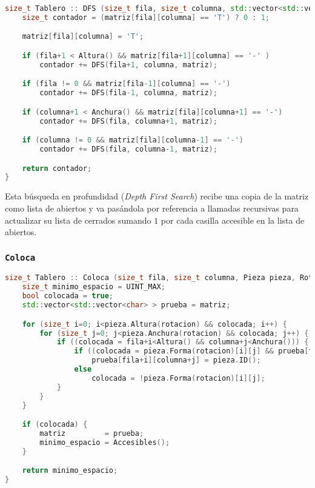 \begin{lstlisting}[language=C++]
size_t Tablero :: DFS (size_t fila, size_t columna, std::vector<std::vector<char> > & matriz) const {
	size_t contador = (matriz[fila][columna] == 'T') ? 0 : 1;

	matriz[fila][columna] = 'T';

	if (fila+1 < Altura() && matriz[fila+1][columna] == '-' )
		contador += DFS(fila+1, columna, matriz);

	if (fila != 0 && matriz[fila-1][columna] == '-')
		contador += DFS(fila-1, columna, matriz);

	if (columna+1 < Anchura() && matriz[fila][columna+1] == '-')
		contador += DFS(fila, columna+1, matriz);

	if (columna != 0 && matriz[fila][columna-1] == '-')
		contador += DFS(fila, columna-1, matriz);

	return contador;
}
\end{lstlisting}

Esta búsqueda en profundidad (\textit{Depth First Search}) recibe una copia de la matriz como lista de abiertos y va pasándola por referencia a llamadas recursivas para actualizar su lista de cerrados sumando $1$ por cada casilla accesible en la lista de abiertos.

\subsubsection{\texttt{Coloca}}\label{grafos-implementacion-tablero-coloca}

\begin{lstlisting}[language=C++]
size_t Tablero :: Coloca (size_t fila, size_t columna, Pieza pieza, Rotacion rotacion) {
	size_t minimo_espacio = UINT_MAX;
	bool colocada = true;
	std::vector<std::vector<char> > prueba = matriz;

	for (size_t i=0; i<pieza.Altura(rotacion) && colocada; i++) {
		for (size_t j=0; j<pieza.Anchura(rotacion) && colocada; j++) {
			if ((colocada = fila+i<Altura() && columna+j<Anchura())) {
				if ((colocada = pieza.Forma(rotacion)[i][j] && prueba[fila+i][columna+j] == '-'))
					prueba[fila+i][columna+j] = pieza.ID();
				else
					colocada = !pieza.Forma(rotacion)[i][j];
			}
		}
	}

	if (colocada) {
		matriz         = prueba;
		minimo_espacio = Accesibles();
	}

	return minimo_espacio;
}
\end{lstlisting}

